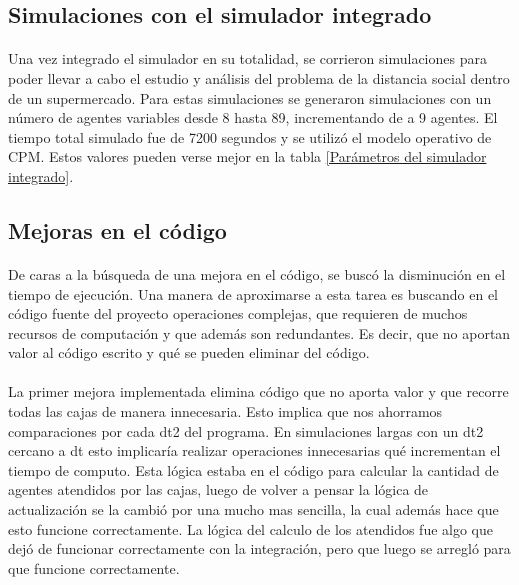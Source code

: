 \documentclass{article}
\begin{document}
\subsection{Simulaciones con el simulador integrado}

\paragraph{}
Una vez integrado el simulador en su totalidad, se corrieron simulaciones para poder llevar a cabo el estudio y análisis del problema de la distancia social dentro de un supermercado. Para estas simulaciones se generaron simulaciones con un número de agentes variables desde 8 hasta 89, incrementando de a 9 agentes. El tiempo total simulado fue de 7200 segundos y se utilizó el modelo operativo de CPM.  Estos valores pueden verse mejor en la tabla \ref{Parámetros del simulador integrado}.

\subsection{Mejoras en el código}

\paragraph{}
De caras a la búsqueda de una mejora en el código, se buscó la disminución en el tiempo de ejecución. Una manera de aproximarse a esta tarea es buscando en el código fuente del proyecto operaciones complejas, que requieren de muchos recursos de computación y que además son redundantes. Es decir, que no aportan valor al código escrito y qué se pueden eliminar del código.

\paragraph{}
La primer mejora implementada elimina código que no aporta valor y que recorre todas las cajas de manera innecesaria. Esto implica que nos ahorramos comparaciones por cada dt2 del programa. En simulaciones largas con un dt2 cercano a dt esto implicaría realizar operaciones innecesarias qué incrementan el tiempo de computo. Esta lógica estaba en el código para calcular la cantidad de agentes atendidos por las cajas, luego de volver a pensar la lógica de actualización se la cambió por una mucho mas sencilla, la cual además hace que esto funcione correctamente. La lógica del calculo de los atendidos fue algo que dejó de funcionar correctamente con la integración, pero que luego se arregló para que funcione correctamente.
\end{document}
